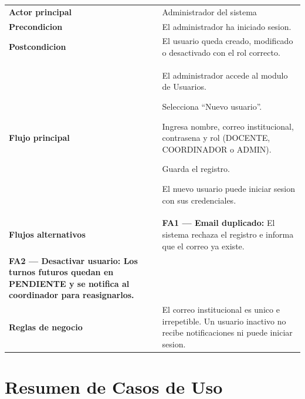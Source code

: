 \documentclass[12pt, a4paper]{article}
\newcommand{\cu}[3]{%
  \begin{tcolorbox}[casousostyle, title={#1},
    after title={\hfill\small\normalfont\color{white!80!azulOscuro}#2}]
  \renewcommand{\arraystretch}{1.35}
  \begin{tabularx}{\linewidth}{>{\bfseries\color{azulOscuro}\small}p{3.6cm} X}
  #3
  \end{tabularx}
  \end{tcolorbox}
  \vspace{6pt}
}
\newcommand{\fcu}[2]{\small\textbf{\color{azulOscuro}#1} & \small #2 \\}
\begin{document}
\cu{CU-16 --- Gestionar usuarios}{Administrador}{
  \fcu{Actor principal}{Administrador del sistema}
  \fcu{Precondicion}{El administrador ha iniciado sesion.}
  \fcu{Postcondicion}{El usuario queda creado, modificado o desactivado con el rol correcto.}
  \fcu{Flujo principal}{
    \begin{pasos}
      \item El administrador accede al modulo de Usuarios.
      \item Selecciona ``Nuevo usuario''.
      \item Ingresa nombre, correo institucional, contrasena y rol (DOCENTE, COORDINADOR o ADMIN).
      \item Guarda el registro.
      \item El nuevo usuario puede iniciar sesion con sus credenciales.
    \end{pasos}
  }
  \fcu{Flujos alternativos}{
    \textbf{FA1 --- Email duplicado:} El sistema rechaza el registro e informa que el correo ya existe.\\[4pt]
    \textbf{FA2 --- Desactivar usuario:} Los turnos futuros quedan en PENDIENTE y se notifica al coordinador para reasignarlos.
  }
  \fcu{Reglas de negocio}{El correo institucional es unico e irrepetible. Un usuario inactivo no recibe notificaciones ni puede iniciar sesion.}
}

\newpage

\section{Resumen de Casos de Uso}
\end{document}
